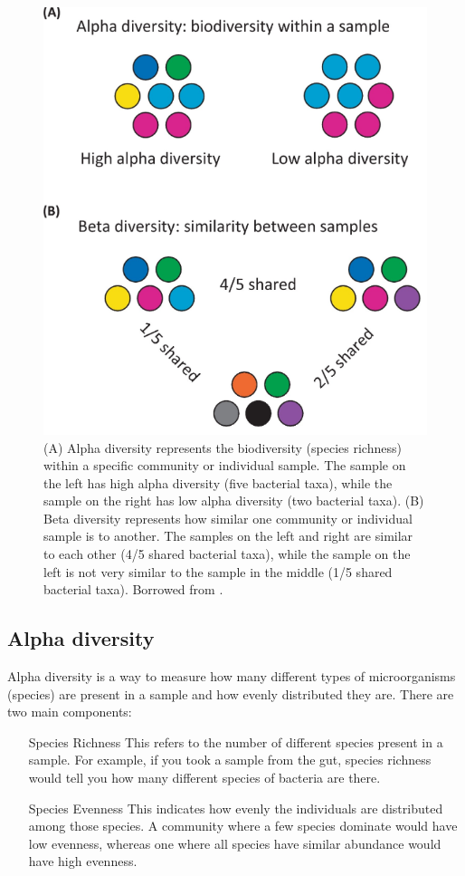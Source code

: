 \begin{figure}[!ht]
    \centering
    \includegraphics[width=1\linewidth]{./figure/microbial_diversity.png}
    \caption{(A) Alpha diversity represents the biodiversity (species richness) within a specific community or individual 
    sample. The sample on the left has high alpha diversity (five bacterial taxa), while the sample on the right has low 
    alpha diversity (two bacterial taxa). (B) Beta diversity represents how similar one community or individual sample 
    is to another. The samples on the left and right are similar to each other (4/5 shared bacterial taxa), while the 
    sample on the left is not very similar to the sample in the middle (1/5 shared bacterial taxa). 
    Borrowed from  \cite{Thrackray2019}.}
    \label{fig:microbial_diversity}
\end{figure}


\subsection{Alpha diversity}
Alpha diversity is a way to measure how many different types of microorganisms (species) are present in a sample and how 
evenly distributed they are. There are two main components:
\begin{itemize}
    \item[Species Richness] This refers to the number of different species present in a sample. For example, if you took 
    a sample from the gut, species richness would tell you how many different species of bacteria are there.
    \item[Species Evenness] This indicates how evenly the individuals are distributed among those species. A community 
    where a few species dominate would have low evenness, whereas one where all species have similar abundance would have high evenness.
\end{itemize}

